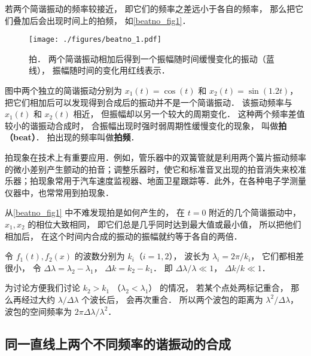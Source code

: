 
\begin{issues}
\issueDraft
\end{issues}


若两个简谐振动的频率较接近， 即它们的频率之差远小于各自的频率， 那么把它们叠加后会出现时间上的拍频， 如\autoref{beatno_fig1}．
\begin{figure}[ht]
\centering
\texttt{[image: ./figures/beatno\_1.pdf]}
\caption{拍． 两个简谐振动相加后得到一个振幅随时间缓慢变化的振动（蓝线）， 振幅随时间的变化用红线表示．} \label{beatno_fig1}
\end{figure}
图中两个独立的简谐振动分别为 $x_1(t) = \cos(t)$ 和 $x_2(t) = \sin(1.2t)$， 把它们相加后可以发现得到合成后的振动并不是一个简谐振动． 该振动频率与 $x_1(t)$ 和 $x_2(t)$ 相近， 但振幅却以另一个较大的周期变化． 这种两个频率差值较小的谐振动合成时， 合振幅出现时强时弱周期性缓慢变化的现象， 叫做\textbf{拍（beat）}． 拍出现的频率叫做\textbf{拍频}．

拍现象在技术上有重要应用．例如，管乐器中的双簧管就是利用两个簧片振动频率的微小差别产生颤动的拍音；调整乐器时，使它和标准音叉出现的拍音消失来校准乐器；拍现象常用于汽车速度监视器、地面卫星跟踪等．此外，在各种电子学测量仪器中，也常常用到拍现象．

从\autoref{beatno_fig1} 中不难发现拍是如何产生的， 在 $t = 0$ 附近的几个简谐振动中， $x_1, x_2$ 的相位大致相同， 即它们总是几乎同时达到最大值或最小值， 所以把他们相加后， 在这个时间内合成的振动的振幅就约等于各自的两倍．



令 $f_1(t), f_2(x)$ 的波数分别为 $k_i$（$i=1,2$）， 波长为 $\lambda_i = 2\pi/k_i$， 它们都相差很小， 令 $\Delta \lambda = \lambda_2 - \lambda_1$， $\Delta k = k_2 - k_1$． 即 $\Delta \lambda/\lambda \ll 1$， $\Delta k/k \ll 1$．

为讨论方便我们讨论 $k_2 > k_1$ （$\lambda_2 < \lambda_1$） 的情况， 若某个点处两标记重合， 那么再经过大约 $\lambda/\Delta\lambda$ 个波长后， 会再次重合． 所以两个波包的距离为 $\lambda^2/\Delta\lambda$， 波包的空间频率为 $2\pi \Delta \lambda/\lambda^2$．


\subsection{同一直线上两个不同频率的谐振动的合成}

